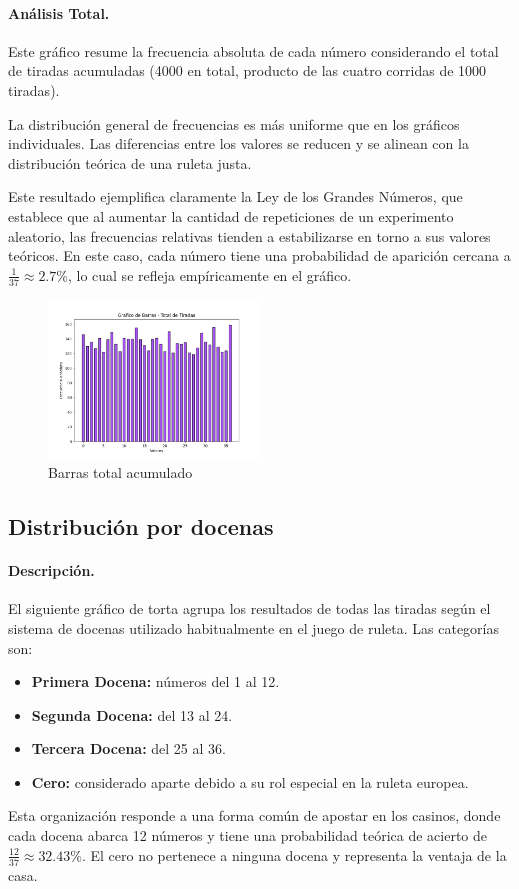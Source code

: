 \documentclass{article}
\begin{document}
\paragraph{Análisis Total.} 
Este gráfico resume la frecuencia absoluta de cada número considerando el total de tiradas acumuladas (4000 en total, producto de las cuatro corridas de 1000 tiradas).

La distribución general de frecuencias es más uniforme que en los gráficos individuales. Las diferencias entre los valores se reducen y se alinean con la distribución teórica de una ruleta justa.
 
Este resultado ejemplifica claramente la Ley de los Grandes Números, que establece que al aumentar la cantidad de repeticiones de un experimento aleatorio, las frecuencias relativas tienden a estabilizarse en torno a sus valores teóricos. En este caso, cada número tiene una probabilidad de aparición cercana a $\frac{1}{37}\approx 2.7\%$, lo cual se refleja empíricamente en el gráfico.
\begin{figure} [H]
    \centering
    \includegraphics[width=0.5\textwidth]{Imagenes/BarrasTiradasTotales.png}
    \caption{Barras total acumulado}
\end{figure}

\subsection{Distribución por docenas}
\paragraph{Descripción.}
  El siguiente gráfico de torta agrupa los resultados de todas las tiradas según el sistema de docenas utilizado habitualmente en el juego de ruleta. Las categorías son:
    \begin{itemize}
        \item \textbf{Primera Docena:} números del 1 al 12.
        \item \textbf{Segunda Docena:} del 13 al 24.
        \item \textbf{Tercera Docena:} del 25 al 36.
        \item \textbf{Cero:} considerado aparte debido a su rol especial en la ruleta europea. 
    \end{itemize}
Esta organización responde a una forma común de apostar en los casinos, donde cada docena abarca 12 números y tiene una probabilidad teórica de acierto de $\frac{12}{37} \approx 32.43\%$. El cero no pertenece a ninguna docena y representa la ventaja de la casa.
\end{document}
